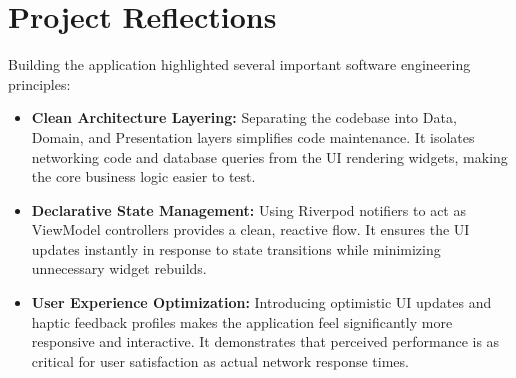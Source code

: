 \section{Project Reflections}
Building the application highlighted several important software engineering principles:
\begin{itemize}
    \item \textbf{Clean Architecture Layering:} Separating the codebase into Data, Domain, and Presentation layers simplifies code maintenance. It isolates networking code and database queries from the UI rendering widgets, making the core business logic easier to test.
    \item \textbf{Declarative State Management:} Using Riverpod notifiers to act as ViewModel controllers provides a clean, reactive flow. It ensures the UI updates instantly in response to state transitions while minimizing unnecessary widget rebuilds.
    \item \textbf{User Experience Optimization:} Introducing optimistic UI updates and haptic feedback profiles makes the application feel significantly more responsive and interactive. It demonstrates that perceived performance is as critical for user satisfaction as actual network response times.
\end{itemize}

